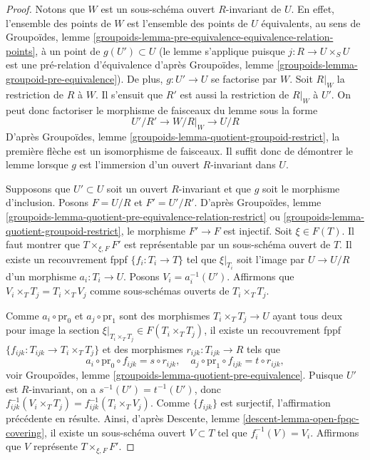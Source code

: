 \begin{proof}
Notons que $W$ est un sous-schéma ouvert $R$-invariant de $U$.
En effet, l'ensemble des points de $W$ est l'ensemble
des points de $U$ équivalents, au sens de
Groupoïdes,
lemme \ref{groupoids-lemma-pre-equivalence-equivalence-relation-points},
à un point de $g(U') \subset U$ (le lemme s'applique puisque $j : R \to U \times_S U$
est une pré-relation d'équivalence d'après
Groupoïdes, lemme \ref{groupoids-lemma-groupoid-pre-equivalence}).
De plus, $g : U' \to U$ se factorise par $W$.
Soit $R|_W$ la restriction de $R$ à $W$.
Il s'ensuit que $R'$ est aussi la restriction de $R|_W$ à $U'$.
On peut donc factoriser le morphisme de faisceaux du lemme sous la forme
$$
U'/R' \longrightarrow W/R|_W \longrightarrow U/R
$$
D'après Groupoïdes, lemme \ref{groupoids-lemma-quotient-groupoid-restrict},
la première flèche est un isomorphisme de faisceaux.
Il suffit donc de démontrer le lemme lorsque $g$ est l'immersion
d'un ouvert $R$-invariant dans $U$.

\medskip\noindent
Supposons que $U' \subset U$ soit un ouvert $R$-invariant et que $g$ soit le
morphisme d'inclusion. Posons $F = U/R$ et $F' = U'/R'$. D'après
Groupoïdes,
lemme \ref{groupoids-lemma-quotient-pre-equivalence-relation-restrict}
ou \ref{groupoids-lemma-quotient-groupoid-restrict},
le morphisme $F' \to F$ est injectif. Soit $\xi \in F(T)$.
Il faut montrer que $T \times_{\xi, F} F'$ est représentable
par un sous-schéma ouvert de $T$.
Il existe un recouvrement fppf $\{f_i : T_i \to T\}$ tel que
$\xi|_{T_i}$ soit l'image par $U \to U/R$ d'un morphisme $a_i : T_i \to U$.
Posons $V_i = a_i^{-1}(U')$.
Affirmons que $V_i \times_T T_j = T_i \times_T V_j$ comme sous-schémas ouverts
de $T_i \times_T T_j$.

\medskip\noindent
Comme $a_i \circ \text{pr}_0$ et $a_j \circ \text{pr}_1$ sont des morphismes
$T_i \times_T T_j \to U$ ayant tous deux pour image la section
$\xi|_{T_i \times_T T_j} \in F(T_i \times_T T_j)$, il existe
un recouvrement fppf $\{f_{ijk} : T_{ijk} \to T_i \times_T T_j\}$ et des morphismes
$r_{ijk} : T_{ijk} \to R$ tels que
$$
a_i \circ \text{pr}_0 \circ f_{ijk} = s \circ r_{ijk},
\quad
a_j \circ \text{pr}_1 \circ f_{ijk} = t \circ r_{ijk},
$$
voir
Groupoïdes, lemme \ref{groupoids-lemma-quotient-pre-equivalence}.
Puisque $U'$ est $R$-invariant, on a $s^{-1}(U') = t^{-1}(U')$, donc
$f_{ijk}^{-1}(V_i \times_T T_j) = f_{ijk}^{-1}(T_i \times_T V_j)$.
Comme $\{f_{ijk}\}$ est surjectif, l'affirmation précédente en résulte.
Ainsi, d'après
Descente, lemme \ref{descent-lemma-open-fpqc-covering},
il existe un sous-schéma ouvert $V \subset T$ tel que
$f_i^{-1}(V) = V_i$. Affirmons que $V$ représente $T \times_{\xi, F} F'$.


\end{proof}

